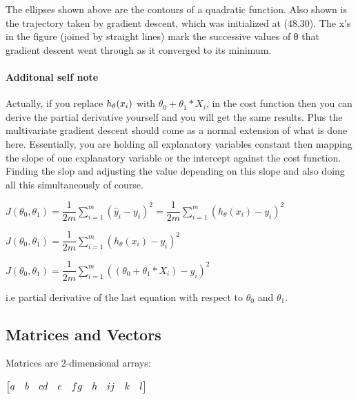 \documentclass[
]{article}
\begin{document}
The ellipses shown above are the contours of a quadratic function. Also
shown is the trajectory taken by gradient descent, which was initialized
at (48,30). The x's in the figure (joined by straight lines) mark the
successive values of θ that gradient descent went through as it
converged to its minimum.

\hypertarget{additonal-self-note}{%
\paragraph{Additonal self note}\label{additonal-self-note}}

{ Actually, if you replace \(\\h_\theta (x_i)\) with
\(\theta_0 + \theta_1*X_i\), in the cost function then you can derive
the partial derivative yourself and you will get the same results. Plus
the multivariate gradient descent should come as a normal extension of
what is done here. Essentially, you are holding all explanatory
variables constant then mapping the slope of one explanatory variable or
the intercept against the cost function. Finding the slop and adjusting
the value depending on this slope and also doing all this simultaneously
of course. }

\(J(\theta_0, \theta_1) = \dfrac {1}{2m} \displaystyle \sum _{i=1}^m \left ( \hat{y}_{i}- y_{i} \right)^2 = \dfrac {1}{2m} \displaystyle \sum _{i=1}^m \left (h_\theta (x_{i}) - y_{i} \right)^2\)

\(J(\theta_0, \theta_1) = \dfrac {1}{2m} \displaystyle \sum _{i=1}^m \left (h_\theta (x_{i}) - y_{i} \right)^2\)

\(J(\theta_0, \theta_1) = \dfrac {1}{2m} \displaystyle \sum _{i=1}^m \left ((\theta_0 + \theta_1*X_i) - y_{i} \right)^2\)

{i.e partial derivative of the last equation with respect to
\(\theta_0\) and \(\theta_1\).}

\hypertarget{matrices-and-vectors}{%
\subsection{Matrices and Vectors}\label{matrices-and-vectors}}

Matrices are 2-dimensional arrays:

\(\begin{bmatrix} a & b & c \newline d & e & f \newline g & h & i \newline j & k & l\end{bmatrix}\)
\end{document}
